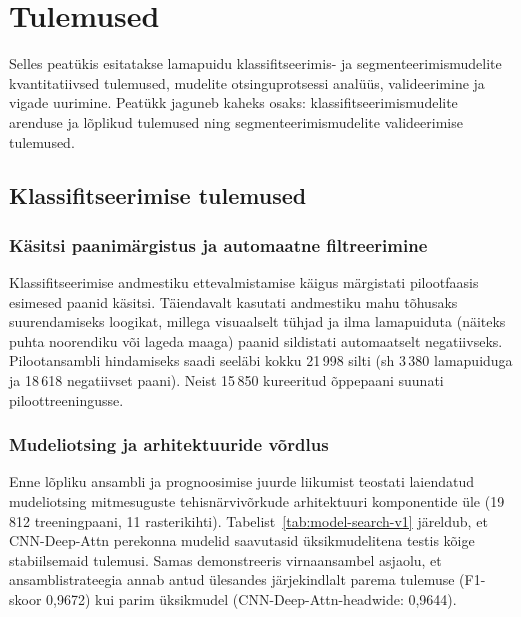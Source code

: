 \section{Tulemused}
\label{tulemused}

Selles peatükis esitatakse lamapuidu klassifitseerimis- ja segmenteerimismudelite kvantitatiivsed tulemused, mudelite otsinguprotsessi analüüs, valideerimine ja vigade uurimine. Peatükk jaguneb kaheks osaks: klassifitseerimismudelite arenduse ja lõplikud tulemused ning segmenteerimismudelite valideerimise tulemused.

\subsection{Klassifitseerimise tulemused}
\label{klassifitseerimise-tulemused}

\subsubsection{Käsitsi paanimärgistus ja automaatne filtreerimine}
\label{kasitsi-paanimargistus}

Klassifitseerimise andmestiku ettevalmistamise käigus märgistati pilootfaasis esimesed paanid käsitsi. Täiendavalt kasutati andmestiku mahu tõhusaks suurendamiseks loogikat, millega visuaalselt tühjad ja ilma lamapuiduta (näiteks puhta noorendiku või lageda maaga) paanid sildistati automaatselt negatiivseks. Pilootansambli hindamiseks saadi seeläbi kokku 21\,998 silti (sh 3\,380 lamapuiduga ja 18\,618 negatiivset paani). Neist 15\,850 kureeritud õppepaani suunati piloottreeningusse.

\subsubsection{Mudeliotsing ja arhitektuuride võrdlus}
\label{mudeli-otsinguprotsess}

Enne lõpliku ansambli ja prognoosimise juurde liikumist teostati laiendatud mudeliotsing mitmesuguste tehisnärvivõrkude arhitektuuri komponentide üle (19\,812 treeningpaani, 11 rasterikihti). Tabelist~\ref{tab:model-search-v1} järeldub, et CNN-Deep-Attn perekonna mudelid saavutasid üksikmudelitena testis kõige stabiilsemaid tulemusi. Samas demonstreeris virnaansambel asjaolu, et ansamblistrateegia annab antud ülesandes järjekindlalt parema tulemuse (F1-skoor 0,9672) kui parim üksikmudel (CNN-Deep-Attn-headwide: 0,9644).

